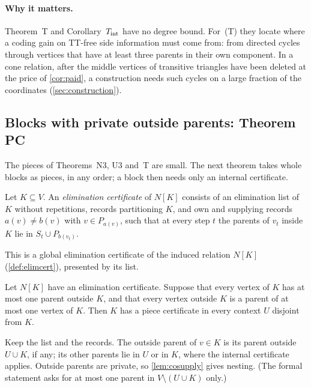 \paragraph{Why it matters.} Theorem~T and Corollary~$T_{\mathrm{int}}$ have no degree bound. For~(T) they locate where a coding
gain on TT-free side information must come from: from directed cycles through vertices that have at least three parents
in their own component. In a cone relation, after the middle vertices of transitive triangles have been deleted at the
price of \cref{cor:paid}, a construction needs such cycles on a large fraction of the coordinates
(\cref{sec:construction}).

\subsection{Blocks with private outside parents: Theorem PC}\label{sec:PC}

The pieces of Theorems~N3, U3 and~T are small. The next theorem takes whole blocks as pieces, in any order; a block
then needs only an internal certificate.

\begin{definition}\label{def:elimon}
Let $K\subseteq V$. An \emph{elimination certificate} of $N[K]$ consists of an elimination list of $K$ without
repetitions, records partitioning $K$, and own and supplying records $a(v)\ne b(v)$ with $v\in P_{a(v)}$, such that at
every step $t$ the parents of $v_t$ inside $K$ lie in $S_t\cup P_{b(v_t)}$.
\end{definition}

This is a global elimination certificate of the induced relation $N[K]$ (\cref{def:elimcert}), presented by its list.

\begin{lemma}\label{lem:elimon-piece}
Let $N[K]$ have an elimination certificate. Suppose that every vertex of $K$ has at most one parent outside $K$, and that
every vertex outside $K$ is a parent of at most one vertex of $K$. Then $K$ has a piece certificate in every context $U$
disjoint from $K$.
\end{lemma}

\begin{outline}
Keep the list and the records. The outside parent of $v\in K$ is its parent outside $U\cup K$, if any; its other
parents lie in $U$ or in $K$, where the internal certificate applies. Outside parents are private, so
\cref{lem:cosupply} gives nesting. (The formal statement asks for at most one parent in $V\setminus(U\cup K)$ only.)
\end{outline}

